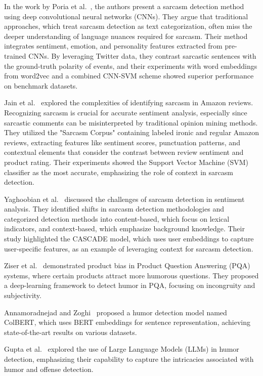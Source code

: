 \documentclass[10pt,twocolumn,letterpaper]{article}
\begin{document}
In the work by Poria et al.~\cite{poria2020}, the authors present a sarcasm detection method using deep convolutional neural networks (CNNs). They argue that traditional approaches, which treat sarcasm detection as text categorization, often miss the deeper understanding of language nuances required for sarcasm. Their method integrates sentiment, emotion, and personality features extracted from pre-trained CNNs. By leveraging Twitter data, they contrast sarcastic sentences with the ground-truth polarity of events, and their experiments with word embeddings from word2vec and a combined CNN-SVM scheme showed superior performance on benchmark datasets.

Jain et al.~\cite{jain2019} explored the complexities of identifying sarcasm in Amazon reviews. Recognizing sarcasm is crucial for accurate sentiment analysis, especially since sarcastic comments can be misinterpreted by traditional opinion mining methods. They utilized the "Sarcasm Corpus" containing labeled ironic and regular Amazon reviews, extracting features like sentiment scores, punctuation patterns, and contextual elements that consider the contrast between review sentiment and product rating. Their experiments showed the Support Vector Machine (SVM) classifier as the most accurate, emphasizing the role of context in sarcasm detection.

Yaghoobian et al.~\cite{yaghoobian2020} discussed the challenges of sarcasm detection in sentiment analysis. They identified shifts in sarcasm detection methodologies and categorized detection methods into content-based, which focus on lexical indicators, and context-based, which emphasize background knowledge. Their study highlighted the CASCADE model, which uses user embeddings to capture user-specific features, as an example of leveraging context for sarcasm detection.

Ziser et al.~\cite{ziser2020} demonstrated product bias in Product Question Answering (PQA) systems, where certain products attract more humorous questions. They proposed a deep-learning framework to detect humor in PQA, focusing on incongruity and subjectivity.

Annamoradnejad and Zoghi~\cite{annamoradnejad2020} proposed a humor detection model named ColBERT, which uses BERT embeddings for sentence representation, achieving state-of-the-art results on various datasets.

Gupta et al.~\cite{gupta2021} explored the use of Large Language Models (LLMs) in humor detection, emphasizing their capability to capture the intricacies associated with humor and offense detection.
\end{document}
